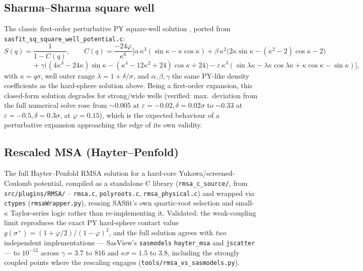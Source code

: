 \documentclass[11pt,a4paper]{article}
\newcommand{\code}[1]{\texttt{#1}}
\begin{document}
\subsection{Sharma--Sharma square well}
\label{sec:sharma-sharma}
The classic first-order perturbative PY square-well solution
\cite{sharma1977}, ported from
\code{sasfit\_sq\_square\_well\_potential.c}:
\begin{equation}
  S(q) = \frac{1}{1-C(q)}, \qquad
  C(q) = \frac{-24\varphi}{\kappa^6}\Big[\alpha\,\kappa^3(\sin\kappa-\kappa\cos\kappa)
    + \beta\,\kappa^2\big(2\kappa\sin\kappa-(\kappa^2{-}2)\cos\kappa-2\big)
\end{equation}
\begin{equation}
  \qquad\qquad + \gamma\big((4\kappa^3{-}24\kappa)\sin\kappa-(\kappa^4{-}12\kappa^2{+}24)\cos\kappa+24\big)
    - \varepsilon\,\kappa^3(\sin\lambda\kappa-\lambda\kappa\cos\lambda\kappa+\kappa\cos\kappa-\sin\kappa)\Big],
\end{equation}
with $\kappa=q\sigma$, well outer range $\lambda=1+\delta/\sigma$, and
$\alpha,\beta,\gamma$ the same PY-like density coefficients as the hard-sphere
solution above. Being a first-order expansion, this closed-form solution
degrades for strong/wide wells (verified: max.\ deviation from the full
numerical solve rose from $\sim0.005$ at $\varepsilon=-0.02,\delta=0.02\sigma$
to $\sim0.33$ at $\varepsilon=-0.5,\delta=0.3\sigma$, at $\varphi=0.15$), which
is the expected behaviour of a perturbative expansion approaching the edge of
its own validity.

\subsection{Rescaled MSA (Hayter--Penfold)}
\label{sec:hayter-penfold}
The full Hayter--Penfold RMSA solution for a hard-core Yukawa/screened-Coulomb
potential, compiled as a standalone C library (\code{rmsa\_c\_source/}, from
\code{src/plugins/RMSA/} -- \code{rmsa.c}, \code{polyroots.c},
\code{rmsa\_physical.c}) and wrapped via
\code{ctypes} (\code{rmsaWrapper.py}), reusing SASfit's own quartic-root
selection and small-$\kappa$ Taylor-series logic rather than re-implementing
it. Validated: the weak-coupling limit reproduces the exact PY hard-sphere
contact value $g(\sigma^+)=(1+\varphi/2)/(1-\varphi)^2$, and the full
solution agrees with \emph{two} independent implementations --- SasView's
\code{sasmodels} \code{hayter\_msa} and \code{jscatter} --- to $10^{-12}$
across $\gamma = 3.7$ to $816$ and $\kappa\sigma = 1.5$ to $3.8$, including
the strongly coupled points where the rescaling engages
(\code{tools/rmsa\_vs\_sasmodels.py}).
\end{document}
